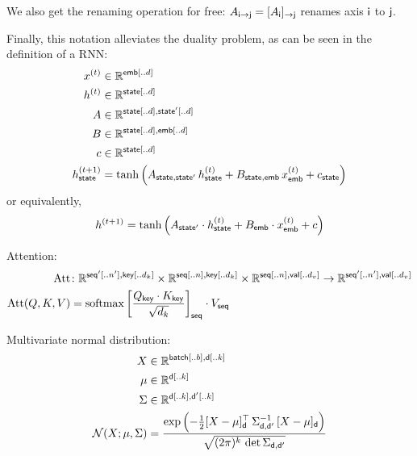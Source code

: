 \documentclass{article}
\DeclareMathOperator*{\softmax}{softmax}
\begin{document}
We also get the renaming operation for free: $A_{\mathsf{i}\rightarrow\mathsf{j}} = [A_{\mathsf{i}}]_{\rightarrow\mathsf{j}}$ renames axis $\mathsf{i}$ to $\mathsf{j}$.

Finally, this notation alleviates the duality problem, as can be seen in the definition of a RNN:
\begin{align*}
x^{(t)} &\in \mathbb{R}^{\mathsf{emb}[..d]} \\
h^{(t)} &\in \mathbb{R}^{\mathsf{state}[..d]} \\
A &\in \mathbb{R}^{\mathsf{state}[..d], \mathsf{state'}[..d]} \\
B &\in \mathbb{R}^{\mathsf{state}[..d], \mathsf{emb}[..d]} \\
c &\in \mathbb{R}^{\mathsf{state}[..d]} \\
h^{(t+1)}_{\mathsf{state}} &= \tanh\left( A_{\mathsf{state},\mathsf{state'}} \, h^{(t)}_{\mathsf{state}} + B_{\mathsf{state},\mathsf{emb}} \, x^{(t)}_{\mathsf{emb}} + c_{\mathsf{state}} \right)
\end{align*}
or equivalently,
\begin{equation*}
h^{(t+1)} = \tanh\left( A_{\mathsf{state'}} \cdot h^{(t)}_{\mathsf{state}} + B_{\mathsf{emb}} \cdot x^{(t)}_{\mathsf{emb}} + c \right)
\end{equation*}

Attention:
\begin{align*}
  \text{Att} &\colon \mathbb{R}^{\nset{seq'}{..n'},\nset{key}{..d_k}} \times \mathbb{R}^{\nset{seq}{..n},\nset{key}{..d_k}} \times \mathbb{R}^{\nset{seq}{..n},\nset{val}{..d_v}} \rightarrow \mathbb{R}^{\nset{seq'}{..n'},\nset{val}{..d_v}} \\
  \text{Att}(Q,K,V) &= \softmax \left[ \frac{Q_{\name{key}} \cdot K_\name{key}}{\sqrt{d_k}} \right]_{\name{seq}} \cdot V_{\name{seq}}
\end{align*}

Multivariate normal distribution:
\begin{align*} 
X &\in \mathbb{R}^{\mathsf{batch}[..{b}], \mathsf{d}[..{k}]}  \\
\mu &\in \mathbb{R}^{{\mathsf{d}[..{k}]}}  \\
\Sigma & \in   \mathbb{R}^{{\mathsf{d}[..k], \mathsf{d'}[..k]}}  \\
{\cal N}(X; \mu, \Sigma) &= \frac{\displaystyle \exp\left(-\tfrac{1}{2} [X - \mu]_{\mathsf{d}}^\top \, \Sigma_{\mathsf{d},\mathsf{d'}}^{-1} \, [X - \mu]_{\mathsf{d}} \right)}{\sqrt{(2 \pi)^k \, \mathop{\text{det}} \Sigma_{\mathsf{d},\mathsf{d'}}}}
\end{align*}
\end{document}
